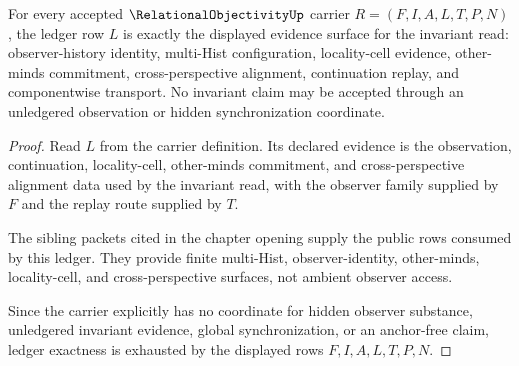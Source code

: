 \begin{theorem}
\label{thm:relational-objectivity-invariant-ledger-exactness}
For every accepted $\RelationalObjectivityUp$ carrier $R=(F,I,A,L,T,P,N)$, the ledger row $L$ is exactly the displayed evidence surface for the invariant read: observer-history identity, multi-Hist configuration, locality-cell evidence, other-minds commitment, cross-perspective alignment, continuation replay, and componentwise transport. No invariant claim may be accepted through an unledgered observation or hidden synchronization coordinate.
\end{theorem}
\begin{proof}
Read $L$ from the carrier definition. Its declared evidence is the observation, continuation, locality-cell, other-minds commitment, and cross-perspective alignment data used by the invariant read, with the observer family supplied by $F$ and the replay route supplied by $T$.

The sibling packets cited in the chapter opening supply the public rows consumed by this ledger. They provide finite multi-Hist, observer-identity, other-minds, locality-cell, and cross-perspective surfaces, not ambient observer access.

Since the carrier explicitly has no coordinate for hidden observer substance, unledgered invariant evidence, global synchronization, or an anchor-free claim, ledger exactness is exhausted by the displayed rows $F,I,A,L,T,P,N$.
\end{proof}

